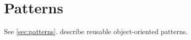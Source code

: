\documentclass{article}
\begin{document}
\section{Patterns}\label{sec:patterns}

See \autoref{sec:patterns}. \textcite{gamma1995design} describe reusable object-oriented patterns.

\printbibliography
\end{document}
